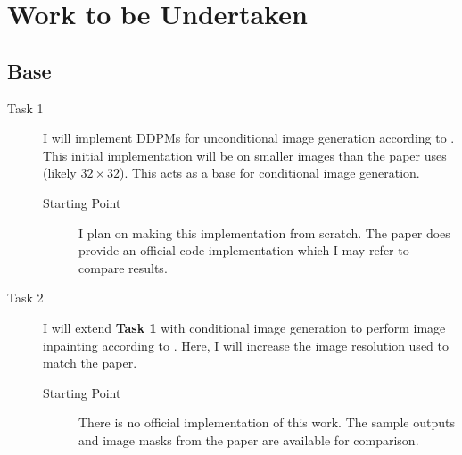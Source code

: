 \documentclass{article}
\begin{document}
\section{Work to be Undertaken}

\subsection{Base}

\makeatletter
\let\orgdescriptionlabel\descriptionlabel
\renewcommand*{\descriptionlabel}[1]{%
  \let\orglabel\label
  \let\label\@gobble
  \phantomsection
  \edef\@currentlabel{#1}%
  \let\label\orglabel
  \orgdescriptionlabel{#1}%
}
\makeatother

\begin{description}
\item[Task 1] I will implement DDPMs for unconditional image generation according to \cite{Ho-2020}. This initial implementation will be on smaller images than the paper uses (likely $32 \times 32$). This acts as a base for conditional image generation.
\begin{description}
\item[Starting Point] I plan on making this implementation from scratch. The paper does provide an official code implementation which I may refer to compare results.
\end{description}
\item[Task 2] I will extend \textbf{Task 1} with conditional image generation to perform image inpainting according to \cite{Saharia-2022}. Here, I will increase the image resolution used to match the paper.
\begin{description}
\item[Starting Point] There is no official implementation of this work. The sample outputs and image masks from the paper are available for comparison.
\end{description}
\end{description}
\end{document}
